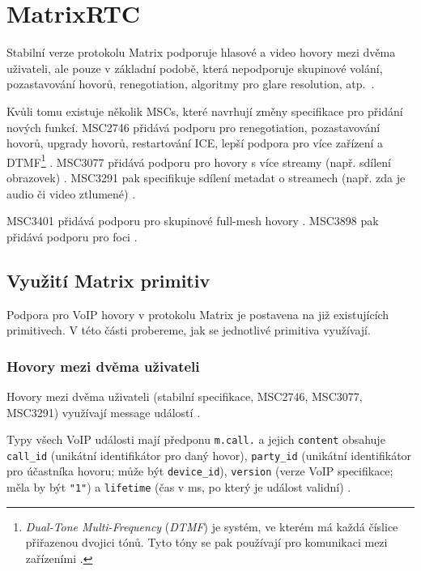 \section{MatrixRTC}\label{matrixRTC}

Stabilní verze protokolu Matrix podporuje hlasové a video hovory mezi dvěma
uživateli, ale pouze v základní podobě, která nepodporuje skupinové volání,
pozastavování hovorů, renegotiation, algoritmy pro glare resolution,
atp.~\cite{MatrixORG-Spec}.

Kvůli tomu existuje několik MSCs, které navrhují změny specifikace pro přidání
nových funkcí. MSC2746 přidává podporu pro renegotiation, pozastavování hovorů,
upgrady hovorů, restartování ICE, lepší podpora pro více zařízení a
DTMF\footnote{
	\textit{Dual-Tone Multi-Frequency} (\textit{DTMF}) je systém, ve kterém má
	každá číslice přiřazenou dvojici tónů. Tyto tóny se pak používají pro
	komunikaci mezi zařízeními \cite{DSTNY-DTMF}.
} \cite{GitHub-MSC2746}. MSC3077 přidává podporu pro hovory s více streamy
(např. sdílení obrazovek) \cite{GitHub-MSC3077}. MSC3291 pak specifikuje sdílení
metadat o streamech (např. zda je audio či video ztlumené)
\cite{GitHub-MSC3291}.

MSC3401 přidává podporu pro skupinové full-mesh hovory \cite{GitHub-MSC3401}.
MSC3898 pak přidává podporu pro foci \cite{GitHub-MSC3898}.

\subsection{Využití Matrix primitiv}

Podpora pro VoIP hovory v protokolu Matrix je postavena na již existujících
primitivech. V této části probereme, jak se jednotlivé primitiva využívají.

\subsubsection{Hovory mezi dvěma uživateli}\label{dmCalls}

Hovory mezi dvěma uživateli (stabilní specifikace, MSC2746, MSC3077, MSC3291)
využívají message událostí
\cite{MatrixORG-Spec,GitHub-MSC2746,GitHub-MSC3077,GitHub-MSC3291}.

Typy všech VoIP události mají předponu \texttt{m.call.} a jejich
\texttt{content} obsahuje \texttt{call_id} (unikátní
identifikátor pro daný hovor), \texttt{party_id} (unikátní
identifikátor pro účastníka hovoru; může být \texttt{device_id}),
\texttt{version} (verze VoIP specifikace; měla by být
\texttt{"1"}) a \texttt{lifetime} (čas v
\unit{\milli\second}, po který je událost validní)
\cite{MatrixORG-Spec,GitHub-MSC2746}.

